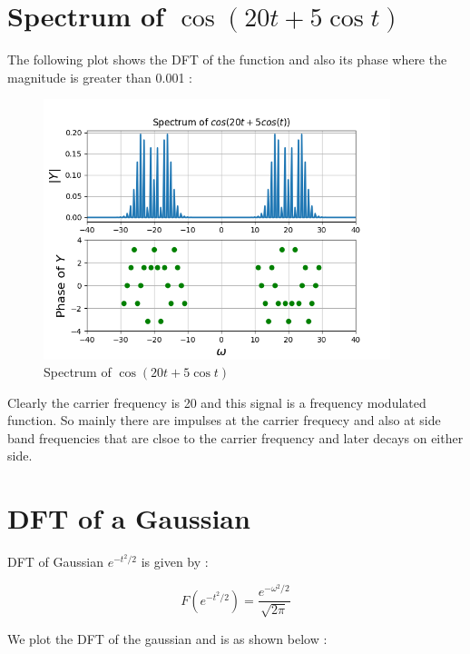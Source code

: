 \documentclass[10pt,a4paper]{article}
\begin{document}
\section{Spectrum of $\cos( 20t + 5\cos t)$}

The following plot shows the DFT of the function and also its phase where the magnitude is greater than 0.001 : 

\begin{figure}[!tbh]

\includegraphics[width = 0.9\textwidth]{3-spectrum of cos(20t +5 cos(t)).png}
\caption{Spectrum of $\cos( 20t + 5\cos t)$}

\end{figure}

Clearly the carrier frequency is 20 and this signal is a frequency modulated function. So mainly there are impulses at the carrier frequecy and also at side band frequencies that are clsoe to the carrier frequency and later decays on either side.


\section{DFT of a Gaussian}

 DFT of Gaussian $e^{-t^2/2}$ is given by : 

\begin{equation*}
F(e^{-t^2/2}) = \frac{e^{-\omega^2/2}}{\sqrt{2\pi}}
\end{equation*}

We plot the DFT of the gaussian and is as shown below : 
\end{document}
